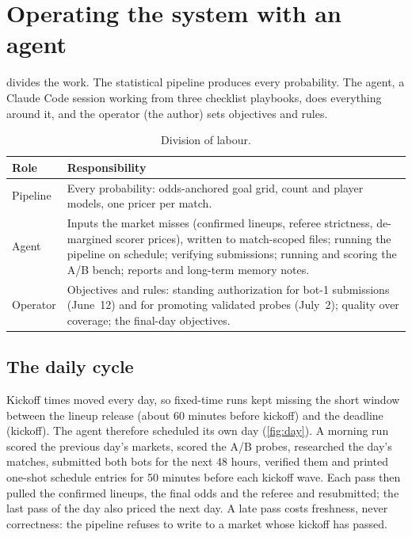 \documentclass[11pt]{article}
\begin{document}
\section{Operating the system with an agent}\label{sec:ops}

 divides the work. The statistical pipeline produces every probability. The
agent, a Claude Code session working from three checklist playbooks, does everything around
it, and the operator (the author) sets objectives and rules.

\begin{table}[tbp]
\centering
\caption{Division of labour.}
\label{tab:roles}
\begin{tabularx}{\textwidth}{@{}l L@{}}
\toprule
Role & Responsibility \\
\midrule
Pipeline & Every probability: odds-anchored goal grid, count and player models, one pricer per match. \\
Agent & Inputs the market misses (confirmed lineups, referee strictness, de-margined scorer prices),
  written to match-scoped files; running the pipeline on schedule; verifying submissions;
  running and scoring the A/B bench; reports and long-term memory notes. \\
Operator & Objectives and rules: standing authorization for bot-1 submissions (June~12) and for
  promoting validated probes (July~2); quality over coverage; the final-day objectives. \\
\bottomrule
\end{tabularx}
\end{table}

\subsection{The daily cycle}\label{sec:cycle}

Kickoff times moved every day, so fixed-time runs kept missing the short window between the
lineup release (about 60 minutes before kickoff) and the deadline (kickoff). The agent therefore
scheduled its own day (\cref{fig:day}). A morning run scored the previous day's markets,
scored the A/B probes, researched the day's matches, submitted both bots for the next 48 hours,
verified them and printed one-shot schedule entries for 50 minutes before each kickoff wave. Each
pass then pulled the confirmed lineups, the final odds and the referee and resubmitted; the last
pass of the day also priced the next day. A late pass costs freshness, never correctness: the
pipeline refuses to write to a market whose kickoff has passed.
\end{document}
